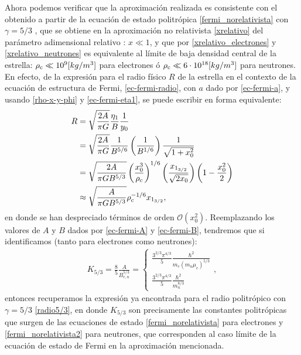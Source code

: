 Ahora podemos verificar que la aproximación realizada es consistente con el obtenido a partir de la ecuación de estado politrópica \eqref{fermi_norelativista} con $\gamma=5/3$ , que se obtiene en la aproximación no relativista \eqref{xrelativo} del parámetro adimensional relativo : $x\ll1$, y que por \eqref{xrelativo_electrones} y  \eqref{xrelativo_neutrones} es equivalente al límite de baja densidad central de la estrella: $\rho_{\rm c}\ll10^{9}[kg/m^3]$ para electrones ó $\rho_{\rm c}\ll6\cdot10^{18}[kg/m^3]$ para neutrones. En efecto, de la expresión para el radio físico $R$ de la estrella en el contexto de la ecuación de estructura de Fermi, \eqref{ec-fermi-radio}, con $a$ dado por \eqref{ec-fermi-a}, y usando \eqref{rho-x-y-phi} y \eqref{ec-fermi-eta1}, se puede escribir en forma equivalente:
\begin{align}
 R&=\sqrt{\frac{2A}{\pi G}}\frac{\eta_1}{B}\frac{1}{y_0}\\
&=\sqrt{\frac{2A}{\pi G} }\frac{1}{B^{5/6}}\left(\frac{1}{B^{1/6}}\right)\frac{1}{\sqrt{1+x_0^2}}\\
&=\sqrt{\frac{2A}{\pi G B^{5/3}}}\left(\frac{x_0^3}{\rho_{\rm c}}\right)^{1/6}\left(\frac{x_{1_{3/2}}}{\sqrt{2x_0}}\right)\left(1-\frac{x_0^2}{2}\right)\\
&\approx\sqrt{\frac{A}{\pi G B^{5/3}}}\rho_{\rm c}^{-1/6}x_{1_{3/2}},
\end{align}
en donde se han despreciado términos de orden $\mathcal{O}(x_0^2)$. Reemplazando los valores  de $A$ y $B$ dados por \eqref{ec-fermi-A} y \eqref{ec-fermi-B}, tendremos que si identificamos (tanto para electrones como neutrones):
\begin{align}
 K_{5/3}=\frac{8}{5}\frac{A}{B_{e,n}^{5/3}}=
\begin{cases}
 \frac{3^{2/3}\pi^{4/3}}{5}\frac{\hbar^2 }{m_e(m_u\mu_e)^{5/3}}\\
\frac{3^{2/3}\pi^{4/3}}{5}\frac{\hbar^2 }{m_n^{8/3}}
\end{cases},
\end{align}
entonces recuperamos la expresión ya encontrada para el radio politrópico con $\gamma=5/3$ \eqref{radio5/3}, en donde $K_{5/3}$ son precisamente las constantes politrópicas que surgen de las ecuaciones de estado \eqref{fermi_norelativista} para electrones y \eqref{fermi_norelativista2} para neutrones, que corresponden al caso límite de la ecuación de estado de Fermi en la aproximación mencionada.


